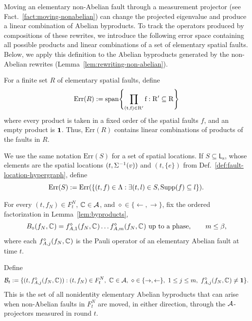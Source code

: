 \documentclass[11pt]{article}
\begin{document}
Moving an elementary non-Abelian fault through a measurement projector (see Fact.~\ref{fact:moving-nonabelian}) can change the projected eigenvalue and produce a linear combination of Abelian byproducts.
To track the operators produced by compositions of these rewrites, we introduce the following error space containing all possible products and linear combinations of a set of elementary spatial faults.
Below, we apply this definition to the Abelian byproducts generated by the non-Abelian rewrites (Lemma~\ref{lem:rewriting-non-abelian}).

\begin{definition}
    For a finite set $R$ of elementary spatial faults, define 
    \[
    \mathrm{Err}(R) := \rm{span}\Biggl\{\prod_{(t,f)\in R'} f:R'\subseteq R\Biggr\}
    \]
    where every product is taken in a fixed order of the spatial faults $f$, and an empty product is $\mathbf{1}$.
    Thus, $\mathrm{Err}(R)$ contains linear combinations of products of the faults in $R$.

    We use the same notation $\mathrm{Err}(S)$ for a set of spatial locations.
    If $S\subseteq \mathsf{L}_\mathrm{s}$, whose elements are the spatial locations $(t,\Sigma^{-1}(v))$ and $(t,\{e\})$ from Def.~\ref{def:fault-location-hypergraph}, 
    define
    \[
    \mathrm{Err}(S) := \mathrm{Err}(\{(t,f)\in \Lambda: \exists (t,l)\in S, \operatorname{Supp}(f)\subseteq l\}).
    \]
\end{definition}

For every $(t,f_N)\in F_t^N$, $\mathbb{C}_{}\in \mathcal{A}$, and $\diamond\in \{\leftarrow, \rightarrow\}$, fix the ordered factorization in Lemma~\ref{lem:byproducts},
\begin{align}
\label{eq:b-arrow-factorization}
    B_\diamond(f_N,\mathbb{C}_{}) = f_{A,1}^\diamond(f_N,\mathbb{C}_{})\dots f_{A,m}^\diamond(f_N,\mathbb{C}_{})\ \text{up to a phase},\qquad m\le \beta,
\end{align}
where each $f_{A,j}^\diamond(f_N,\mathbb{C}_{})$ is the Pauli operator of an elementary Abelian fault at time $t$.

Define 
\[
\mathcal{B}_t:=\{(t,f_{A,j}^{\diamond}(f_N, \mathbb{C}_{})):(t,f_N)\in F_t^N,\ \mathbb{C}_{}\in \mathcal{A},\  \diamond\in \{\rightarrow, \leftarrow\},\ 1\le j\le m,\ f_{A,j}^\diamond(f_N, \mathbb{C}_{})\neq \mathbf{1}\}.
\]
This is the set of all nonidentity elementary Abelian byproducts that can arise when non-Abelian faults in $F_t^N$ are moved, in either direction, through the $\mathcal{A}$-projectors measured in round $t$.
\end{document}
